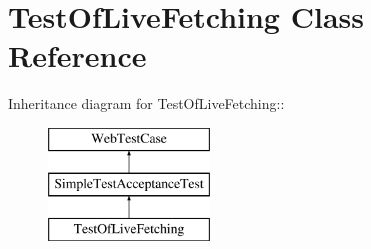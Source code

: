 \hypertarget{class_test_of_live_fetching}{
\section{TestOfLiveFetching Class Reference}
\label{class_test_of_live_fetching}
}
Inheritance diagram for TestOfLiveFetching::\begin{figure}[H]
\begin{center}
\leavevmode
\includegraphics[height=3cm]{class_test_of_live_fetching}
\end{center}
\end{figure}
